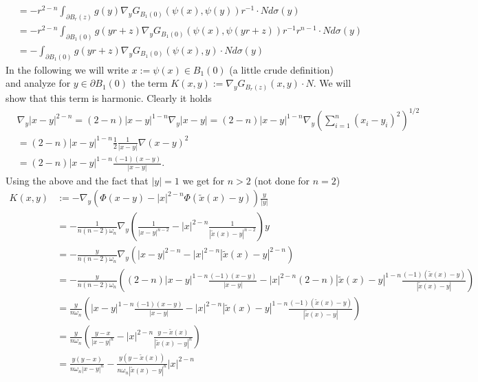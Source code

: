 \documentclass[A4,12pt,twoside]{book}
\begin{document}
{\begin{align*}
    &= - r^{2-n} \int_{\partial B_r (z)}  g(y) \nabla_{y} G_{B_1 (0)}  ( \psi (x),\psi (y) ) r^{-1} \cdot N d \sigma (y) \\
    &= - r^{2-n} \int_{\partial B_1 (0)}  g(yr+z) \nabla_{y} G_{B_1 (0)}  ( \psi (x),\psi (yr+z) ) r^{-1} r^{n-1} \cdot N d \sigma (y) \\
    &= -  \int_{\partial B_1 (0)}  g(yr+z) \nabla_{y} G_{B_1 (0)}  ( \psi (x),y )  \cdot N d \sigma (y) 
    \end{align*}
    In the following we will write $x := \psi (x) \in B_1 (0)$ (a little crude definition) and analyze for $y \in \partial B_1 (0)$ the term $K (x,y) :=  \nabla_y G_{B_r (z)}  (x,y) \cdot N$. We will show that this term is harmonic. Clearly it holds 
    \begin{align*}
        &\nabla_y |x-y|^{2-n} = (2-n) |x-y|^{1-n} \nabla_y |x-y| = (2-n) |x-y|^{1-n} \nabla_y \left( \sum_{i=1}^n (x_i - y_i)^2 \right)^{1/2} \\
        &= (2-n) |x-y|^{1-n} \frac{1}{2} \frac{1}{|x-y|} \nabla (x-y)^2 \\
        &=  (2-n) |x-y|^{1-n} \frac{(-1) (x-y)}{|x-y|}.
    \end{align*}
    Using the above and the fact that $|y|=1$  we get for $n >2$ (not done for $n=2$) 
    \begin{align*}
        K(x,y) &:=- \nabla_y \left( \Phi(x-y) - |x|^{2-n} \Phi (\tilde{x}(x) -y) \right) \frac{y}{|y|} \\
        &= - \frac{1}{n(n-2) \omega_n } \nabla_y \left( \frac{1}{|x-y|^{n-2}} - |x|^{2-n} \frac{1}{|\tilde{x}(x) -y |^{n-2}} \right) y \\
        &= - \frac{y}{n(n-2) \omega_n  } \nabla_y \left( |x-y|^{2-n} - |x|^{2-n} |\tilde{x}(x) -y |^{2-n} \right) \\
        &= - \frac{y}{n (n-2)\omega_n  }\left( (2-n) |x-y|^{1-n} \frac{(-1) (x-y)}{|x-y|} - |x|^{2-n} (2-n) |\tilde{x}(x)-y|^{1-n} \frac{(-1)(\tilde{x}(x)-y)}{|\tilde{x}(x)-y|}  \right) \\
        &=  \frac{y}{n \omega_n  }\left(  |x-y|^{1-n} \frac{(-1) (x-y)}{|x-y|} - |x|^{2-n}  |\tilde{x}(x)-y|^{1-n} \frac{(-1)(\tilde{x}(x)-y)}{|\tilde{x}(x)-y|}  \right) \\
        &=  \frac{y}{n \omega_n  }\left(  \frac{y-x}{|x-y|^n} - |x|^{2-n}  \frac{y-\tilde{x}(x)}{|\tilde{x}(x)-y|^n}  \right) \\
        &=  \frac{y(y-x) }{n \omega_n |x-y|^n }- \frac{y(y-\tilde{x}(x)) }{n \omega_n |\tilde{x}(x)-y|^n }|x|^{2-n}   \\

\end{align*}}
\end{document}
